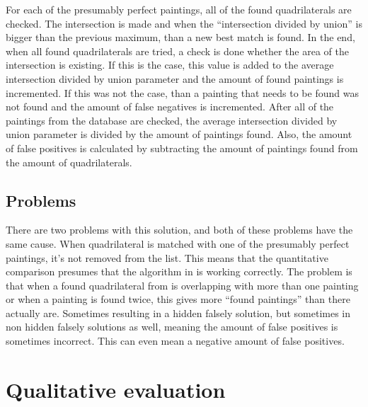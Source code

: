 For each of the presumably perfect paintings, all of the found quadrilaterals are checked. The intersection is made and when the ``intersection divided by union'' is bigger than the previous maximum, than a new best match is found. In the end, when all found quadrilaterals are tried, a check is done whether the area of the intersection is existing. If this is the case, this value is added to the average intersection divided by union parameter and the amount of found paintings is incremented. If this was not the case, than a painting that needs to be found was not found and the amount of false negatives is incremented. After all of the paintings from the database are checked, the average intersection divided by union parameter is divided by the amount of paintings found. Also, the amount of false positives is calculated by subtracting the amount of paintings found from the amount of quadrilaterals.

\subsection{Problems}
There are two problems with this solution, and both of these problems have the same cause. When quadrilateral is matched with one of the presumably perfect paintings, it's not removed from the list. This means that the quantitative comparison presumes that the algorithm in  is working correctly. The problem is that when a found quadrilateral from  is overlapping with more than one painting or when a painting is found twice, this gives more ``found paintings'' than there actually are. Sometimes resulting in a hidden falsely solution, but sometimes in non hidden falsely solutions as well, meaning the amount of false positives is sometimes incorrect. This can even mean a negative amount of false positives.



\section{Qualitative evaluation}


